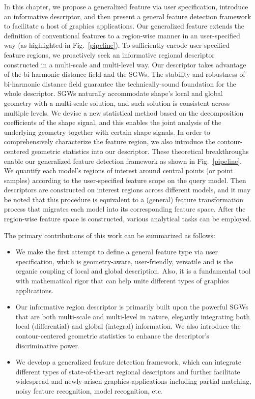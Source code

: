In this chapter, we propose a generalized feature via user
specification, introduce an informative descriptor, and then present a
general feature detection framework to facilitate a host of graphics
applications. Our generalized feature extends the definition of conventional features to a region-wise manner in an
user-specified way (as highlighted in Fig.~\ref{pipeline}). To
sufficiently encode user-specified feature regions, we proactively
seek an informative regional descriptor constructed in a multi-scale
and multi-level way. Our descriptor takes advantage of the bi-harmonic
distance field and the SGWs. The stability and robustness of
bi-harmonic distance field guarantee the technically-sound foundation
for the whole descriptor. SGWs naturally accommodate shape's local and
global geometry with a multi-scale solution, and such solution is
consistent across multiple levels. We devise a new statistical method
based on the decomposition coefficients of the shape signal, and this
enables the joint analysis of the underlying geometry together with
certain shape signals. In order to comprehensively characterize the
feature region, we also introduce the contour-centered geometric
statistics into our descriptor. These theoretical
breakthroughs enable our generalized feature detection framework as
shown in Fig.~\ref{pipeline}. We quantify each model's regions of
interest around central points (or point samples) according to the
user-specified feature scope on the query model. Then descriptors are
constructed on interest regions across different models, and it may be
noted that this procedure is equivalent to a (general) feature
transformation process that migrates each model into its corresponding
feature space. After the region-wise feature space is constructed,
various analytical tasks can be employed.

The primary contributions of this work can be summarized as follows:

\begin{itemize}

\item We make the first attempt to define a general
    feature type via user specification, which is geometry-aware,
    user-friendly, versatile and is the organic coupling of local and
    global description. Also, it is a fundamental tool with
    mathematical rigor that can help unite different types of graphics
    applications.

\item Our informative region descriptor is primarily built upon the
  powerful SGWs that are both multi-scale and multi-level in nature,
 elegantly integrating both local (differential) and
    global (integral) information. We also introduce the
    contour-centered geometric statistics to enhance the descriptor's
    discriminative power.

\item We develop a generalized feature detection framework, which can
  integrate different types of state-of-the-art regional descriptors
  and further facilitate widespread and newly-arisen graphics
  applications including partial matching, noisy feature recognition,
  model recognition, etc.
\end{itemize}

